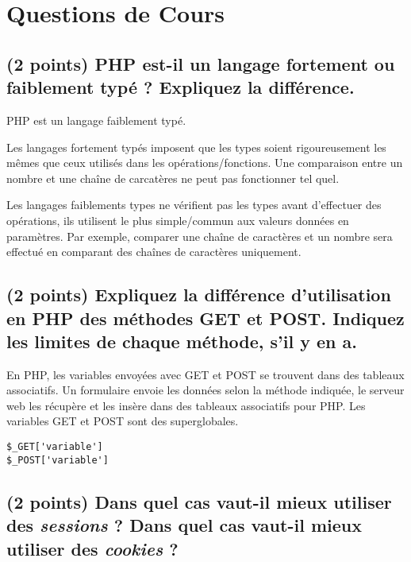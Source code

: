 \documentclass[11pt,a4paper]{article}
\begin{document}
\MakeExamTitle                   %


\section{Questions de Cours}

\subsection{(2 points) PHP est-il un langage fortement ou faiblement typé ? Expliquez la différence.}

\bigskip

PHP est un langage faiblement typé.

Les langages fortement typés imposent que les types soient rigoureusement les mêmes que ceux utilisés dans les opérations/fonctions.
Une comparaison entre un nombre et une chaîne de carcatères ne peut pas fonctionner tel quel.

Les langages faiblements types ne vérifient pas les types avant d'effectuer des opérations, ils utilisent le plus simple/commun aux valeurs données en paramètres.
Par exemple, comparer une chaîne de caractères et un nombre sera effectué en comparant des chaînes de caractères uniquement.

\bigskip

\subsection{(2 points) Expliquez la différence d'utilisation en PHP des méthodes GET et POST. Indiquez les limites de chaque méthode, s'il y en a.}

\bigskip

En PHP, les variables envoyées avec GET et POST se trouvent dans des tableaux associatifs.
Un formulaire envoie les données selon la méthode indiquée, le serveur web les récupère et les insère dans des tableaux associatifs pour PHP.
Les variables GET et POST sont des superglobales.

\begin{verbatim}
$_GET['variable']
$_POST['variable']
\end{verbatim}

\bigskip

\subsection{(2 points) Dans quel cas vaut-il mieux utiliser des \textit{sessions} ? Dans quel cas vaut-il mieux utiliser des \textit{cookies} ?}
\end{document}
